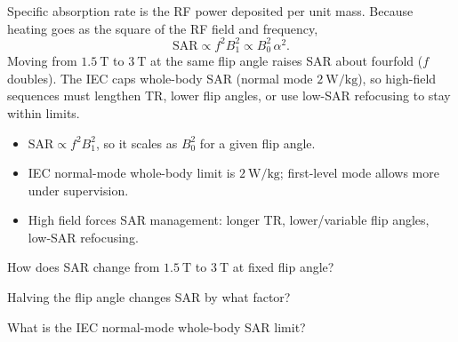 \begin{workedexample}
Specific absorption rate is the RF power deposited per unit mass. Because
heating goes as the square of the RF field and frequency,
\[ \text{SAR} \propto f^2 B_1^2 \propto B_0^2\,\alpha^2. \]
Moving from $1.5\ \text{T}$ to $3\ \text{T}$ at the same flip angle raises SAR about
fourfold ($f$ doubles). The IEC caps whole-body SAR (normal mode $2\ \text{W/kg}$),
so high-field sequences must lengthen TR, lower flip angles, or use low-SAR
refocusing to stay within limits.
\end{workedexample}

\begin{keytakeaways}
\begin{itemize}[leftmargin=1.4em,itemsep=2pt]
\item $\text{SAR} \propto f^2 B_1^2$, so it scales as $B_0^2$ for a given flip angle.
\item IEC normal-mode whole-body limit is $2\ \text{W/kg}$; first-level mode allows more under supervision.
\item High field forces SAR management: longer TR, lower/variable flip angles, low-SAR refocusing.
\end{itemize}
\end{keytakeaways}

\begin{exercises}
\item How does SAR change from $1.5\ \text{T}$ to $3\ \text{T}$ at fixed flip angle?
\item Halving the flip angle changes SAR by what factor?
\item What is the IEC normal-mode whole-body SAR limit?
\end{exercises}

